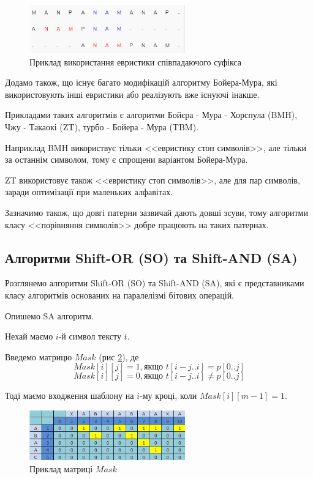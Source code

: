 \documentclass[a4paper,14pt]{extarticle} %
\begin{document}
	\begin{figure}[H] %
		\centering %
		\includegraphics[width=0.6\textwidth]{images/boyer_moore_suffix.png} %
		\caption{Приклад використання евристики співпадаючого суфікса} %
		\label{fig:boyer_moore_suffix} %
	\end{figure}

    \newpage
	Додамо також, що існує багато модифікацій алгоритму Бойера-Мура, які використовують інші евристики або реалізують вже існуючі інакше.
	
	Прикладами таких алгоритмів є алгоритми Бойєра - Мура - Хорспула (BMH), Чжу - Такаокі (ZT), турбо - Бойера - Мура (TBM).

	Наприклад BMH використвує тільки <<евристику стоп символів>>, але тільки за останнім символом, тому є спрощени варіантом Бойера-Мура.

	ZT використовує також <<евристику стоп символів>>, але для пар символів, заради оптимізації при маленьких алфавітах.

	Зазначимо також, що довгі патерни зазвичай дають довші зсуви, тому алгоритми класу <<порівняння символів>> добре працюють на таких патернах.
	\subsection{Алгоритми Shift-OR (SO) та Shift-AND (SA)}

	Розглянемо алгоритми Shift-OR (SO) та Shift-AND (SA), які є представниками класу алгоритмів основаних на паралелізмі бітових операцій.

	Опишемо SA алгоритм.

	Нехай маємо $i$-й символ тексту $t$. 

	Введемо матрицю $Mask$ (рис \ref{fig:shift_or}), де
	\[Mask[i][j] = 1,\text{якщо } t[i-j..i] = p[0..j]\]
	\[Mask[i][j] = 0,\text{якщо } t[i-j..i] \neq  p[0..j]\]

	Тоді маємо входження шаблону на $i$-му кроці, коли $Mask[i][m-1] = 1$.
	\begin{figure}[H]
		\centering
		\includegraphics[width=0.6\textwidth]{images/sa_example.png}
		\caption{Приклад матриці $Mask$}
		\label{fig:shift_or}
	\end{figure}
\end{document}
